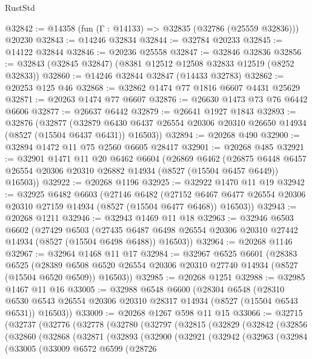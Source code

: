 \begin{lexlean}{RustStd}
\begin{coremodule}
@32842 := @14358 (fun (Γ : @14133) => @32835 (@32786 (@25559 @32836))) @20230
@32843 := @14246 @32834
@32844 := @32784 @20233
@32845 := @14122 @32844
@32846 := @20236 @25558
@32847 := @32846 @32836
@32856 := @32843 (@32845 @32847) (@8381 @12512 @12508 @32833 @12519 (@8252 @32833))
@32860 := @14246 @32844 @32847 (@14433 @32783)
@32862 := @20253 @125 @46
@32868 := @32862 @1474 @77 @1816 @6607 @4431 @25629
@32871 := @20263 @1474 @77 @6607
@32876 := @26630 @1473 @73 @76 @6442 @6606
@32877 := @26637 @6442
@32879 := @26641 @1927 @1843
@32893 := @32876
    (@32877
      (@32879 @6430 @6437 @26554 @20306 @20310 @26650 @14934 (@8527 (@15504 @6437 @6431)) @16503))
@32894 := @20268 @490
@32900 := @32894 @1472 @11 @75 @2560 @6605 @28417
@32901 := @20268 @485
@32921 := @32901
    @1471
    @11
    @20
    @6462
    @6604
    (@26869
      @6462
      (@26875 @6448 @6457 @26554 @20306 @20310 @26882 @14934 (@8527 (@15504 @6457 @6449)) @16503))
@32922 := @20268 @1196
@32925 := @32922 @1470 @11 @19
@32942 := @32925
    @6482
    @6603
    (@27146
      @6482
      (@27152 @6467 @6477 @26554 @20306 @20310 @27159 @14934 (@8527 (@15504 @6477 @6468)) @16503))
@32943 := @20268 @1211
@32946 := @32943 @1469 @11 @18
@32963 := @32946
    @6503
    @6602
    (@27429
      @6503
      (@27435 @6487 @6498 @26554 @20306 @20310 @27442 @14934 (@8527 (@15504 @6498 @6488)) @16503))
@32964 := @20268 @1146
@32967 := @32964 @1468 @11 @17
@32984 := @32967
    @6525
    @6601
    (@28383
      @6525
      (@28389 @6508 @6520 @26554 @20306 @20310 @27740 @14934 (@8527 (@15504 @6520 @6509)) @16503))
@32985 := @20268 @1251
@32988 := @32985 @1467 @11 @16
@33005 := @32988
    @6548
    @6600
    (@28304
      @6548
      (@28310 @6530 @6543 @26554 @20306 @20310 @28317 @14934 (@8527 (@15504 @6543 @6531)) @16503))
@33009 := @20268 @1267 @598 @11 @15
@33066 := @32715
    (@32737
      (@32776
        (@32778
          (@32780
            (@32797
              (@32815
                (@32829
                  (@32842
                    (@32856
                      (@32860
                        (@32868
                          (@32871
                            (@32893
                              (@32900
                                (@32921
                                  (@32942
                                    (@32963
                                      (@32984
                                        (@33005
                                          (@33009
                                            @6572
                                            @6599
                                            (@28726

\end{coremodule}
\end{lexlean}
